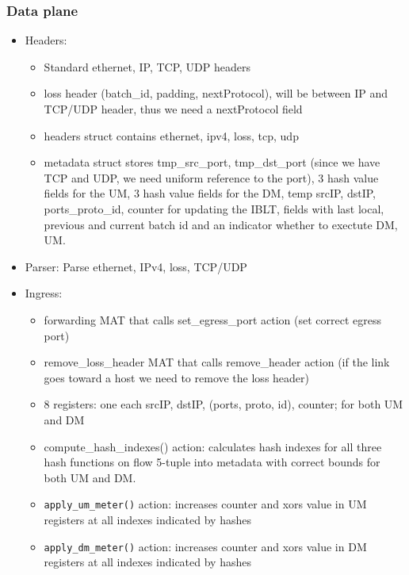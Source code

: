 \documentclass[11pt,oneside,a4paper]{article}
\begin{document}
\subsubsection{Data plane}

\vspace{-\topsep}
\begin{itemize}
	\setlength{\itemsep}{0pt}
	\setlength{\parskip}{0pt}
	\item Headers:
	\begin{itemize}
		\setlength{\itemsep}{0pt}
		\setlength{\parskip}{0pt}
		\item Standard ethernet, IP, TCP, UDP headers
		\item loss header (batch\_id, padding, nextProtocol), will be between IP and TCP/UDP header, thus we need a nextProtocol field
		\item headers struct contains ethernet, ipv4, loss, tcp, udp
		\item metadata struct stores tmp\_src\_port, tmp\_dst\_port (since we have TCP and UDP, we need uniform reference to the port), 3 hash value fields for the UM, 3 hash value fields for the DM, temp srcIP, dstIP, ports\_proto\_id, counter for updating the IBLT, fields with last local, previous and current batch id and an indicator whether to exectute DM, UM.
	\end{itemize}
	\item Parser: Parse ethernet, IPv4, loss, TCP/UDP
	\item Ingress:
	\begin{itemize}
		\setlength{\itemsep}{0pt}
		\setlength{\parskip}{0pt}
		\item forwarding MAT that calls set\_egress\_port action (set correct egress port)
		\item remove\_loss\_header MAT that calls remove\_header action (if the link goes toward a host we need to remove the loss header)
		\item 8 registers: one each srcIP, dstIP, (ports, proto, id), counter; for both UM and DM
		\item compute\_hash\_indexes() action: calculates hash indexes for all three hash functions on flow 5-tuple into metadata with correct bounds for both UM and DM.
		\item \texttt{apply\_um\_meter()} action: increases counter and xors value in UM registers at all indexes indicated by hashes
		\item \texttt{apply\_dm\_meter()} action: increases counter and xors value in DM registers at all indexes indicated by hashes

\end{itemize}
\end{itemize}
\end{document}
